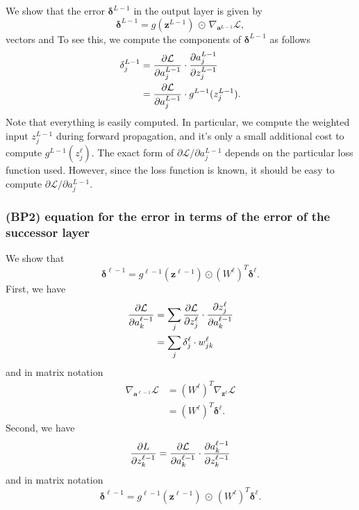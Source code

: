 \documentclass[12pt]{article}
\renewcommand{\a}{\boldsymbol{a}}
\newcommand{\z}{\boldsymbol{z}}
\newcommand{\bdelta}{\boldsymbol{\delta}}
\newcommand{\cL}{\mathcal{L}}
\begin{document}
We show that the error $\bdelta^{L-1}$ in the output layer is given by 
\begin{equation}
\bdelta^{L-1} = g(\z^{L-1}) \, \odot \, \nabla_{\a^{L-1}} \cL,
\end{equation}
vectors and
To see this, we compute the components of $\bdelta^{L-1}$ as follows
\begin{align}
\delta^{L-1}_j 
&= 
{\partial \cL \over \partial a^{L-1}_j} \cdot {\partial a^{L-1}_j \over \partial z^{L-1}_j} \\
&= 
{\partial \cL \over \partial a^{L-1}_j} \cdot g^{L-1}(z^{L-1}_j).
\end{align}
Note that everything is easily computed. In particular, we compute the weighted input $z^{L-1}_j$ during forward propagation, and it's only a small additional cost to compute $g^{L-1}(z^\ell_j)$.
The exact form of ${\partial \cL / \partial a^{L-1}_j}$ depends on the particular loss function used. However, since the loss function is known, it should be easy to compute ${\partial \cL / \partial a^{L-1}_j}$.  

\subsubsection*{(BP2) equation for the error in terms of the error of the successor layer}
We show that 
\begin{equation}
\bdelta^{\ell-1} = g^{\ell-1}(\z^{\ell-1}) \odot (W^{\ell})^T \bdelta^\ell.
\end{equation}
First, we have
\begin{align}
{\partial \cL \over \partial a^{\ell-1}_k} 
&=
\sum_j {\partial \cL \over \partial z^\ell_j} \cdot {\partial z^\ell_j \over \partial a^{\ell-1}_k} \\
&=
\sum_j {\delta^\ell_j} \cdot w^\ell_{jk}
\end{align}
and in matrix notation
\begin{align}
\nabla_{\a^{\ell-1}} \cL 
&=
(W^\ell)^T \nabla_{\z^\ell} \cL \\
&= 
(W^\ell)^T \bdelta^\ell.
\end{align}
Second, we have 
\begin{align}
{\partial L \over \partial z^{\ell-1}_k} = {\partial \cL \over \partial a^{\ell-1}_k} \cdot {\partial a^{\ell-1}_k \over \partial z^{\ell-1}_k}
\end{align}
and in matrix notation
\begin{equation}
\bdelta^{\ell-1} = g^{\ell-1}(\z^{\ell-1}) \, \odot \, (W^\ell)^T \bdelta^\ell.
\end{equation}
\end{document}
